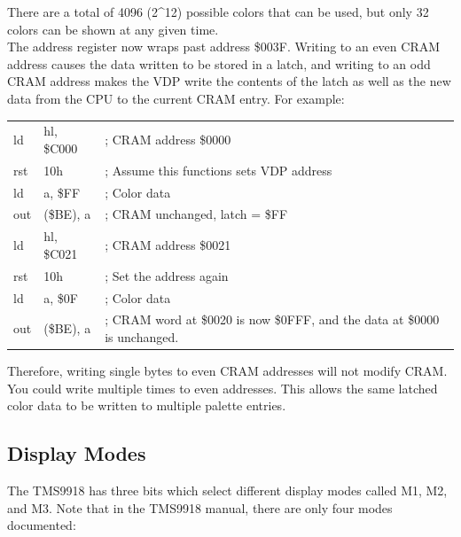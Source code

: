 \documentclass{article}
\begin{document}
There are a total of 4096 (2\^{}12) possible colors that can be used, but only
32 colors can be shown at any given time.                                       
\\

The address register now wraps past address \$003F. Writing to an even CRAM
address causes the data written to be stored in a latch, and writing to an 
odd CRAM address makes the VDP write the contents of the latch as well as
the new data from the CPU to the current CRAM entry. For example:

\begin{table}[H]
    \centering
    \selectfont
    \begin{tabular}{p{1cm} p{1in} p{3.5in}}
        ld  &  hl, \$C000   & ; CRAM address \$0000                     \\
        rst &  10h          & ; Assume this functions sets VDP address  \\
        ld  &  a, \$FF      & ; Color data                              \\
        out &  (\$BE), a    & ; CRAM unchanged, latch = \$FF            \\
        ld  &  hl, \$C021   & ; CRAM address \$0021                     \\
        rst &  10h          & ; Set the address again                   \\
        ld  &  a, \$0F      & ; Color data                              \\
        out &  (\$BE), a    & ; CRAM word at \$0020 is now \$0FFF, 
                                and the data at \$0000 is unchanged.    \\
    \end{tabular}
    \fontfamily{}\selectfont
\end{table}

Therefore, writing single bytes to even CRAM addresses will not modify CRAM.
You could write multiple times to even addresses. This allows the same 
latched color data to be written to multiple palette entries.

\subsection{Display Modes}

The TMS9918 has three bits which select different display modes called M1,
M2, and M3. Note that in the TMS9918 manual, there are only four modes 
documented:
\end{document}
